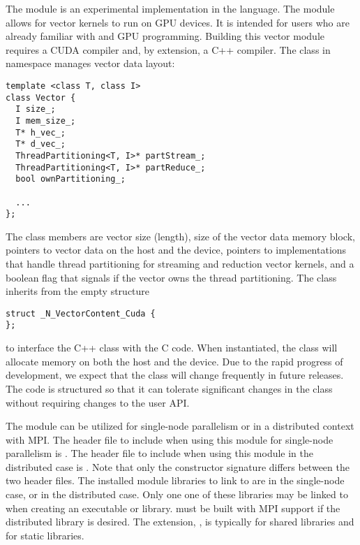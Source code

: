 %
The {\nveccuda} module is an experimental {\nvector} implementation in the {\cuda} language.
The module allows for {\sundials} vector kernels to run on GPU devices. It is intended for users
who are already familiar with {\cuda} and GPU programming. Building this vector
module requires a CUDA compiler and, by extension, a C++ compiler. The class 
in namespace  manages vector data layout:
\begin{verbatim}
template <class T, class I>
class Vector {
  I size_;
  I mem_size_;
  T* h_vec_;
  T* d_vec_;
  ThreadPartitioning<T, I>* partStream_;
  ThreadPartitioning<T, I>* partReduce_;
  bool ownPartitioning_;

  ...
};
\end{verbatim}

The class members are vector size (length), size of the vector data memory block, pointers
to vector data on the host and the device, pointers to 
implementations that handle thread partitioning for streaming and
reduction vector kernels, and a boolean flag that signals if the
vector owns the thread partitioning. The class  inherits from the empty structure
\begin{verbatim}
struct _N_VectorContent_Cuda {
};
\end{verbatim}
to interface the C++ class with the {\nvector} C code. When instantiated, the class
 will allocate memory on both the host and the device. Due to the rapid
progress of {\cuda} development, we expect that the 
class will change frequently in future {\sundials} releases. The code is
structured so that it can tolerate significant changes in the
 class without requiring changes to the user API.


The {\nveccuda} module can be utilized for single-node parallelism or in a distributed context with MPI.
The header file to include when using this module for single-node parallelism is .
The header file to include when using this module in the distributed case is .
Note that only the {\nveccuda} constructor signature differs between the two header files.
The installed module libraries to link to are  in the single-node case,
or  in the distributed case. Only one one of these libraries may be linked to when creating an executable or library. {\sundials} must be built with MPI support if the distributed library is desired. The extension, , is typically  for shared libraries and  for static libraries.

